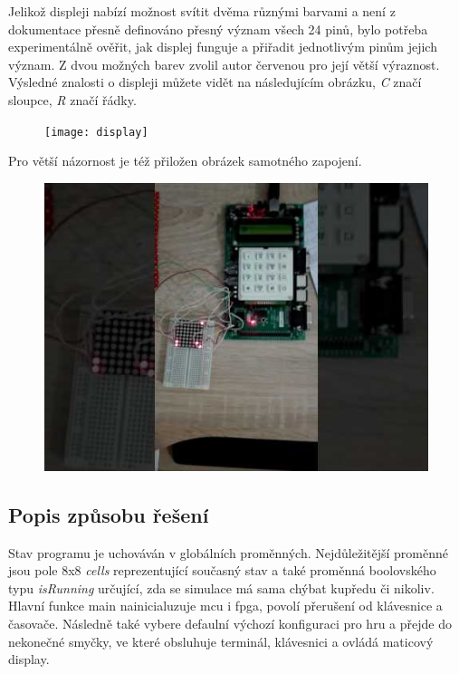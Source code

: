 \documentclass[12pt,a4paper,titlepage]{article}
\begin{document}
Jelikož displeji nabízí možnost svítit dvěma různými barvami a není z dokumentace přesně definováno přesný význam všech 24  pinů, bylo potřeba experimentálně ověřit, jak displej funguje a přiřadit jednotlivým pinům jejich význam. Z dvou možných barev zvolil autor červenou pro její větší výraznost. Výsledné znalosti o displeji můžete vidět na následujícím obrázku, \textit{C} značí sloupce, \textit{R} značí řádky.

\begin{figure}[h]
\centering
\texttt{[image: display]}
 \label{display}
\end{figure}



Pro větší názornost je též přiložen obrázek samotného zapojení.

\begin{figure}[h]
\centering
\includegraphics[scale=0.5]{fitkit}
 \label{foto}
\end{figure}

\subsection{Popis způsobu řešení}
Stav programu je uchováván v globálních proměnných. Nejdůležitější proměnné jsou pole 8x8 \textit{cells} reprezentující současný stav a také proměnná boolovského typu \textit{isRunning} určující, zda se simulace má sama chýbat kupředu či nikoliv. Hlavní funkce main nainicialuzuje mcu i fpga, povolí přerušení od klávesnice a časovače. Následně také vybere defaulní výchozí konfiguraci pro hru a přejde do nekonečné smyčky, ve které obsluhuje terminál, klávesnici a ovládá maticový display.
\end{document}

